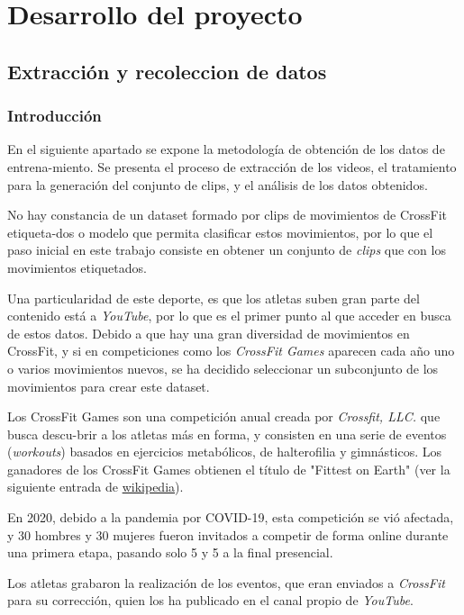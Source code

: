 \chapter{Desarrollo del proyecto}

\section{Extracción y recoleccion de datos}\label{extracción_recolección}

\subsection{Introducción}

En el siguiente apartado se expone la metodología de obtención de los datos de entrena-miento. Se presenta el proceso de extracción de los videos, el tratamiento para la generación del conjunto de clips, y el análisis de los datos obtenidos.

No hay constancia de un dataset formado por clips de movimientos de CrossFit etiqueta-dos o modelo que permita clasificar estos movimientos, por lo que el paso inicial en este trabajo consiste en obtener un conjunto de \textit{clips} que con los movimientos etiquetados.

Una particularidad de este deporte, es que los atletas suben gran parte del contenido está a \textit{YouTube}, por lo que es el primer punto al que acceder en busca de estos datos. Debido a que hay una gran diversidad de movimientos en CrossFit, y si en competiciones como los \textit{CrossFit Games} aparecen cada año uno o varios movimientos nuevos, se ha decidido seleccionar un subconjunto de los movimientos para crear este dataset.

Los CrossFit Games son una competición anual creada por \textit{Crossfit, LLC.} que busca descu-brir a los atletas más en forma, y consisten en una serie de eventos (\textit{workouts}) basados en ejercicios metabólicos, de halterofilia y gimnásticos. Los ganadores de los CrossFit Games obtienen el título de "Fittest on Earth" (ver la siguiente entrada de  \href{https://es.wikipedia.org/wiki/CrossFit_Games}{wikipedia}).

En 2020, debido a la pandemia por COVID-19, esta competición se vió afectada, y 30 hombres y 30 mujeres fueron invitados a competir de forma online durante una primera etapa, pasando solo 5 y 5 a la final presencial.

Los atletas grabaron la realización de los eventos, que eran enviados a \textit{CrossFit} para su corrección, quien los ha publicado en el canal propio de \textit{YouTube}.


